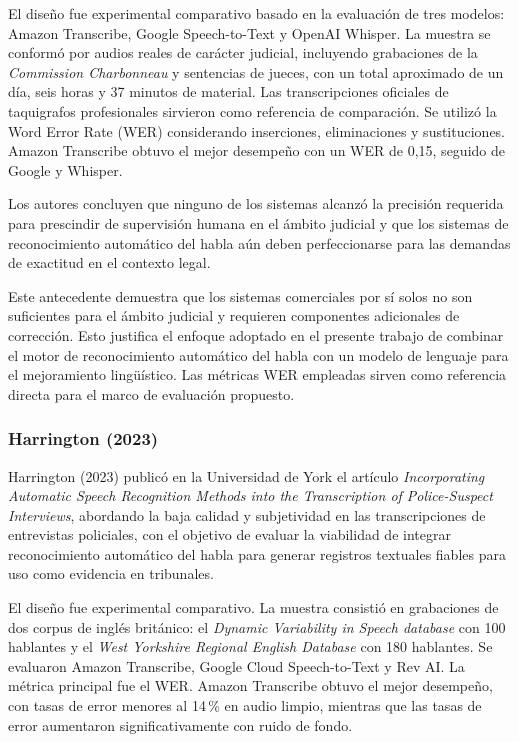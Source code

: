 \documentclass[12pt,a4paper,oneside]{article}
\begin{document}
El dise\~no fue experimental comparativo basado en la evaluaci\'on de tres modelos: Amazon Transcribe, Google Speech-to-Text y OpenAI Whisper. La muestra se conform\'o por audios reales de car\'acter judicial, incluyendo grabaciones de la \textit{Commission Charbonneau} y sentencias de jueces, con un total aproximado de un d\'ia, seis horas y 37 minutos de material. Las transcripciones oficiales de taquigrafos profesionales sirvieron como referencia de comparaci\'on. Se utiliz\'o la Word Error Rate (WER) considerando inserciones, eliminaciones y sustituciones. Amazon Transcribe obtuvo el mejor desempe\~no con un WER de 0{,}15, seguido de Google y Whisper.

Los autores concluyen que ninguno de los sistemas alcanz\'o la precisi\'on requerida para prescindir de supervisi\'on humana en el \'ambito judicial y que los sistemas de reconocimiento autom\'atico del habla a\'un deben perfeccionarse para las demandas de exactitud en el contexto legal.

Este antecedente demuestra que los sistemas comerciales por s\'i solos no son suficientes para el \'ambito judicial y requieren componentes adicionales de correcci\'on. Esto justifica el enfoque adoptado en el presente trabajo de combinar el motor de reconocimiento autom\'atico del habla con un modelo de lenguaje para el mejoramiento ling\"u\'istico. Las m\'etricas WER empleadas sirven como referencia directa para el marco de evaluaci\'on propuesto.

\subsubsection{Harrington (2023)}

Harrington (2023) public\'o en la Universidad de York el art\'iculo \textit{Incorporating Automatic Speech Recognition Methods into the Transcription of Police-Suspect Interviews}, abordando la baja calidad y subjetividad en las transcripciones de entrevistas policiales, con el objetivo de evaluar la viabilidad de integrar reconocimiento autom\'atico del habla para generar registros textuales fiables para uso como evidencia en tribunales.

El dise\~no fue experimental comparativo. La muestra consisti\'o en grabaciones de dos corpus de ingl\'es brit\'anico: el \textit{Dynamic Variability in Speech database} con 100 hablantes y el \textit{West Yorkshire Regional English Database} con 180 hablantes. Se evaluaron Amazon Transcribe, Google Cloud Speech-to-Text y Rev AI. La m\'etrica principal fue el WER. Amazon Transcribe obtuvo el mejor desempe\~no, con tasas de error menores al 14\,\% en audio limpio, mientras que las tasas de error aumentaron significativamente con ruido de fondo.
\end{document}
